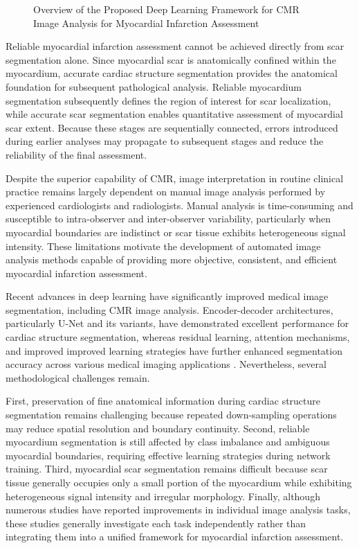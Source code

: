 \begin{figure}[htbp]
	\centering
	\caption{Overview of the Proposed Deep Learning Framework for CMR Image Analysis for Myocardial Infarction Assessment}
	\label{fig:ch1-proposed}
\end{figure}

Reliable myocardial infarction assessment cannot be achieved directly
from scar segmentation alone. Since myocardial scar is anatomically
confined within the myocardium, accurate cardiac structure segmentation
provides the anatomical foundation for subsequent pathological analysis.
Reliable myocardium segmentation subsequently defines the region of
interest for scar localization, while accurate scar segmentation enables
quantitative assessment of myocardial scar extent. Because these stages
are sequentially connected, errors introduced during earlier analyses
may propagate to subsequent stages and reduce the reliability of the
final assessment.

Despite the superior capability of CMR, image interpretation in routine
clinical practice remains largely dependent on manual image analysis
performed by experienced cardiologists and radiologists. Manual analysis
is time-consuming and susceptible to intra-observer and inter-observer
variability, particularly when myocardial boundaries are indistinct or
scar tissue exhibits heterogeneous signal intensity. These limitations
motivate the development of automated image analysis methods capable of
providing more objective, consistent, and efficient myocardial
infarction assessment.

Recent advances in deep learning have significantly improved medical
image segmentation, including CMR image analysis. Encoder-decoder
architectures, particularly U-Net and its variants, have demonstrated
excellent performance for cardiac structure segmentation, whereas
residual learning, attention mechanisms, and improved improved learning
strategies have further enhanced segmentation accuracy across various
medical imaging applications \citep{Ronneberger2015,He2016,Oktay2018}. Nevertheless, several methodological challenges
remain.

First, preservation of fine anatomical information during cardiac
structure segmentation remains challenging because repeated
down-sampling operations may reduce spatial resolution and boundary
continuity. Second, reliable myocardium segmentation is still affected
by class imbalance and ambiguous myocardial boundaries, requiring
effective learning strategies during network training. Third, myocardial
scar segmentation remains difficult because scar tissue generally
occupies only a small portion of the myocardium while exhibiting
heterogeneous signal intensity and irregular morphology. Finally,
although numerous studies have reported improvements in individual image
analysis tasks, these studies generally investigate each task
independently rather than integrating them into a unified framework for
myocardial infarction assessment.


